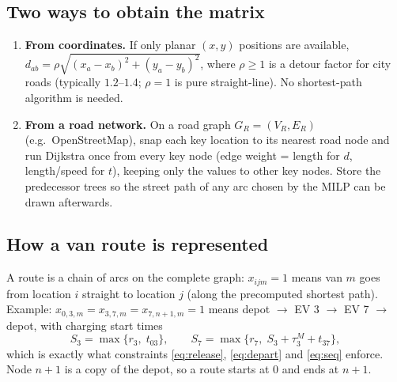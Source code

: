 \documentclass[11pt,a4paper]{article}
\begin{document}
\subsection{Two ways to obtain the matrix}
\begin{enumerate}[leftmargin=1.6em,itemsep=2pt]
  \item \textbf{From coordinates.} If only planar $(x,y)$ positions are available,
  $d_{ab}=\rho\sqrt{(x_a-x_b)^2+(y_a-y_b)^2}$, where $\rho\ge1$ is a detour factor for city roads (typically $1.2$--$1.4$; $\rho=1$ is pure straight-line). No shortest-path algorithm is needed.
  \item \textbf{From a road network.} On a road graph $G_R=(V_R,E_R)$ (e.g.\ OpenStreetMap), snap each key location to its nearest road node and run Dijkstra once from every key node (edge weight = length for $d$, length/speed for $t$), keeping only the values to other key nodes. Store the predecessor trees so the street path of any arc chosen by the MILP can be drawn afterwards.
\end{enumerate}

\subsection{How a van route is represented}
A route is a chain of arcs on the complete graph: $x_{ijm}=1$ means van $m$ goes from location $i$ straight to location $j$ (along the precomputed shortest path). Example: $x_{0,3,m}=x_{3,7,m}=x_{7,n+1,m}=1$ means depot $\to$ EV 3 $\to$ EV 7 $\to$ depot, with charging start times
\[
S_3=\max\{r_3,\;t_{03}\},\qquad S_7=\max\{r_7,\;S_3+\tau^M_3+t_{37}\},
\]
which is exactly what constraints \eqref{eq:release}, \eqref{eq:depart} and \eqref{eq:seq} enforce. Node $n+1$ is a copy of the depot, so a route starts at $0$ and ends at $n+1$.

\begin{center}
\end{center}
\end{document}
